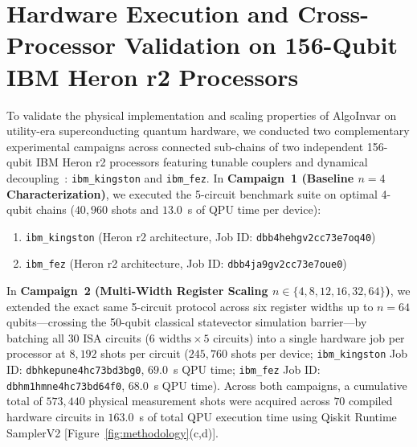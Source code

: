 \documentclass[aps,pra,reprint,superscriptaddress,floatfix,nofootinbib]{revtex4-2}
\begin{document}
\section{Hardware Execution and Cross-Processor Validation on 156-Qubit IBM Heron r2 Processors}

To validate the physical implementation and scaling properties of AlgoInvar on utility-era superconducting quantum hardware, we conducted two complementary experimental campaigns across connected sub-chains of two independent 156-qubit IBM Heron r2 processors featuring tunable couplers and dynamical decoupling~\cite{IBM2024}: \texttt{ibm\_kingston} and \texttt{ibm\_fez}. In \textbf{Campaign~1 (Baseline $n = 4$ Characterization)}, we executed the 5-circuit benchmark suite on optimal 4-qubit chains ($40,960$ shots and $13.0$~s of QPU time per device):
\begin{enumerate}
    \item \texttt{ibm\_kingston} (Heron r2 architecture, Job ID: \texttt{dbb4hehgv2cc73e7oq40})
    \item \texttt{ibm\_fez} (Heron r2 architecture, Job ID: \texttt{dbb4ja9gv2cc73e7oue0})
\end{enumerate}

In \textbf{Campaign~2 (Multi-Width Register Scaling $n \in \{4, 8, 12, 16, 32, 64\}$)}, we extended the exact same 5-circuit protocol across six register widths up to $n = 64$ qubits---crossing the 50-qubit classical statevector simulation barrier---by batching all $30$ ISA circuits ($6\text{ widths} \times 5\text{ circuits}$) into a single hardware job per processor at $8,192$ shots per circuit ($245,760$ shots per device; \texttt{ibm\_kingston} Job ID: \texttt{dbhkepune4hc73bd3bg0}, $69.0$~s QPU time; \texttt{ibm\_fez} Job ID: \texttt{dbhm1hmne4hc73bd64f0}, $68.0$~s QPU time). Across both campaigns, a cumulative total of $573,440$ physical measurement shots were acquired across $70$ compiled hardware circuits in $163.0$~s of total QPU execution time using Qiskit Runtime SamplerV2 [Figure~\ref{fig:methodology}(c,d)].
\end{document}
